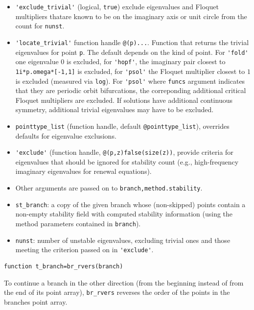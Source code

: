 \documentclass[10pt]{scrartcl}
\newcommand{\blist}[1]{\mbox{\lstinline!#1!}}
\begin{document}
{\begin{itemize}
\begin{itemize}
    alternative way to pass on the arguments. 
  \item \blist{'exclude_trivial'} (logical, \blist{true}) exclude
    eigenvalues and Floquet multipliers thatare known to be on the
    imaginary axis or unit circle from the count for
    \blist{nunst}. 
  \item \blist{'locate_trivial'} function handle
    \blist{@(p)...}. Function that returns the trivial eigenvalues for
    point \blist{p}. The default depends on the kind of point. For
    \blist{'fold'} one eigenvalue $0$ is excluded, for \blist{'hopf'},
    the imaginary pair closest to \blist{1i*p.omega*[-1,1]} is
    excluded, for \blist{'psol'} the Floquet multiplier closest to $1$
    is excluded (measured via \blist{log}). For \blist{'psol'} where
    \blist{funcs} argument indicates that they are periodic orbit
    bifurcations, the correponding additional critical Floquet
    multipliers are excluded. If solutions have additional continuous
    symmetry, additional trivial eigenvalues may have to be excluded.
\item \blist{pointtype_list} (function handle, default \blist{@pointtype_list}),
  overrides defaults for eigenvalue exclusions.
\item \blist{'exclude'} (function handle,
  \blist{@(p,z)false(size(z))}, provide criteria for eigenvalues that
  should be ignored for stability count (e.g., high-frequency
  imaginary eigenvalues for renewal equations).
\item 
    Other arguments are passed on to
    \blist{branch,method.stability}.
\item \blist{st_branch}: a copy of the given branch whose
  (non-skipped) points contain a non-empty stability field with
  computed stability information (using the method parameters
  contained in \blist{branch}).
\item \blist{nunst}: number of unstable eigenvalues, excluding trivial
  ones and those meeting the criterion passed on in \blist{'exclude'}.
\end{itemize}
\end{itemize}

\begin{lstlisting}
function t_branch=br_rvers(branch)  
\end{lstlisting}
\noindent To continue a branch in the other direction (from the
beginning instead of from the end of its point array),
\blist{br_rvers} reverses the order of the points in the branches
point array.

}
\end{document}
